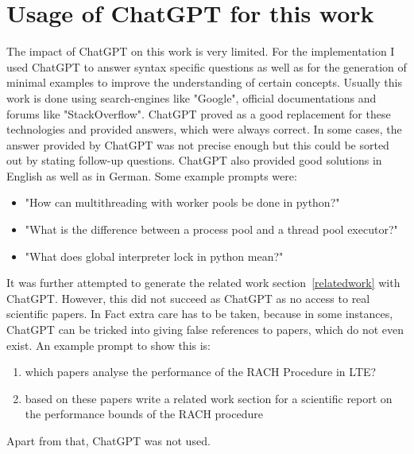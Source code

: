 \documentclass[conference]{IEEEtran}
\begin{document}
\section{Usage of ChatGPT for this work}
The impact of ChatGPT on this work is very limited.
For the implementation I used ChatGPT to answer syntax specific questions as well as for the generation of minimal examples to improve the understanding of certain concepts.
Usually this work is done using search-engines like "Google", official documentations and forums like "StackOverflow".
ChatGPT proved as a good replacement for these technologies and provided answers, which were always correct.
In some cases, the answer provided by ChatGPT was not precise enough but this could be sorted out by stating follow-up questions.
ChatGPT also provided good solutions in English as well as in German.
Some example prompts were:
\begin{itemize}
    \item "How can multithreading with worker pools be done in python?"
    \item "What is the difference between a process pool and a thread pool executor?"
    \item "What does global interpreter lock in python mean?"
\end{itemize}
It was further attempted to generate the related work section~\ref{relatedwork} with ChatGPT.
However, this did not succeed as ChatGPT as no access to real scientific papers.
In Fact extra care has to be taken, because in some instances, ChatGPT can be tricked into giving false references to papers, which do not even exist.
An example prompt to show this is:
\begin{enumerate}
    \item which papers analyse the performance of the RACH Procedure in LTE?
    \item based on these papers write a related work section for a scientific report on the performance bounds of the RACH procedure
\end{enumerate}
Apart from that, ChatGPT was not used.


\end{document}
